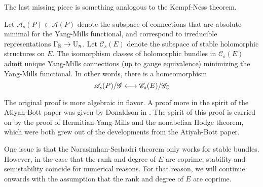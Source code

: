 %
The last missing piece is something analogous to the Kempf-Ness theorem.
%
\begin{thm}
Let $\mathscr{A}_s(P) \subset \mathscr{A}(P)$ denote the subspace of connections
that are absolute minimal for the Yang-Mills functional, and correspond
to irreducible representations $\Gamma_{\mathbb{R}} \to \mathrm{U}_n$. Let $\mathscr{C}_s(E)$
denote the subspace of stable holomorphic structures on $E$. The isomorphism
classes of holomorphic bundles in $\mathscr{C}_s(E)$ admit unique
Yang-Mills connections (up to gauge equivalence) minimizing the Yang-Mills functional.
In other words, there is a homeomorphism
\[
\mathscr{A}_s(P)/\mathscr{G} \longleftrightarrow \mathscr{C}_s(E)/\mathscr{G}_{\mathbb{C}}
\]
\end{thm}
%
\begin{rem*}
The original proof is more algebraic in flavor. A proof more in the spirit
of the Atiyah-Bott paper was given by Donaldson in \cite{donaldson1983}.
The spirit of this proof is carried on by the proof of Hermitian-Yang-Mills
and the nonabelian Hodge theorem, which were both grew out of the
developments from the Atiyah-Bott paper.
\end{rem*}
%
One issue is that the Narasimhan-Seshadri theorem only works for
stable bundles. However, in the case that the rank and degree of $E$
are coprime, stability and semistability coincide for numerical reasons.
For that reason, we will continue onwards with the assumption that the
rank and degree of $E$ are coprime.
%